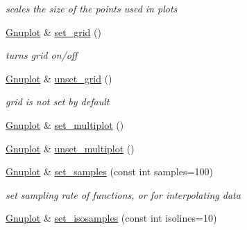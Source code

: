 \begin{DoxyCompactItemize}
\begin{DoxyCompactList}\small\item\em scales the size of the points used in plots \end{DoxyCompactList}\item 
\hypertarget{class_gnuplot_a5416c8e81f1b9945b9631fa85a8d4f47}{\hyperlink{class_gnuplot}{Gnuplot} \& \hyperlink{class_gnuplot_a5416c8e81f1b9945b9631fa85a8d4f47}{set\-\_\-grid} ()}\label{class_gnuplot_a5416c8e81f1b9945b9631fa85a8d4f47}

\begin{DoxyCompactList}\small\item\em turns grid on/off \end{DoxyCompactList}\item 
\hypertarget{class_gnuplot_a53183e1487bc6977f0d46bf75d19b4d3}{\hyperlink{class_gnuplot}{Gnuplot} \& \hyperlink{class_gnuplot_a53183e1487bc6977f0d46bf75d19b4d3}{unset\-\_\-grid} ()}\label{class_gnuplot_a53183e1487bc6977f0d46bf75d19b4d3}

\begin{DoxyCompactList}\small\item\em grid is not set by default \end{DoxyCompactList}\item 
\hyperlink{class_gnuplot}{Gnuplot} \& \hyperlink{class_gnuplot_a67efc4d4dc46b6100d14ba2f7366ef11}{set\-\_\-multiplot} ()
\item 
\hyperlink{class_gnuplot}{Gnuplot} \& \hyperlink{class_gnuplot_aad76cdec16cfb5fdf82f45ed2786f4d8}{unset\-\_\-multiplot} ()
\item 
\hypertarget{class_gnuplot_a671cbe7b18a267ea59f532c83a0035f6}{\hyperlink{class_gnuplot}{Gnuplot} \& \hyperlink{class_gnuplot_a671cbe7b18a267ea59f532c83a0035f6}{set\-\_\-samples} (const int samples=100)}\label{class_gnuplot_a671cbe7b18a267ea59f532c83a0035f6}

\begin{DoxyCompactList}\small\item\em set sampling rate of functions, or for interpolating data \end{DoxyCompactList}\item 
\hypertarget{class_gnuplot_ab810fa4c02fb49ae197786c305b78702}{\hyperlink{class_gnuplot}{Gnuplot} \& \hyperlink{class_gnuplot_ab810fa4c02fb49ae197786c305b78702}{set\-\_\-isosamples} (const int isolines=10)}\label{class_gnuplot_ab810fa4c02fb49ae197786c305b78702}


\end{DoxyCompactItemize}

